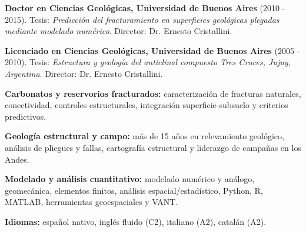 \documentclass[10pt, a4paper]{awesome-cv}
\renewcommand*{\descriptionstyle}[1]{{\fontsize{8.45pt}{10.8pt}\bodyfontlight\upshape\color{text} #1}}
\begin{document}
\vspace{-3mm}
\descriptionstyle{\textbf{Doctor en Ciencias Geológicas, Universidad de Buenos Aires} (2010 - 2015). Tesis: \emph{Predicción del fracturamiento en superficies geológicas plegadas mediante modelado numérico}. Director: Dr. Ernesto Cristallini.}\par
\vspace{0.4mm}
\descriptionstyle{\textbf{Licenciado en Ciencias Geológicas, Universidad de Buenos Aires} (2005 - 2010). Tesis: \emph{Estructura y geología del anticlinal compuesto Tres Cruces, Jujuy, Argentina}. Director: Dr. Ernesto Cristallini.}

\vspace{-3mm}
\descriptionstyle{\textbf{Carbonatos y reservorios fracturados:} caracterización de fracturas naturales, conectividad, controles estructurales, integración superficie-subsuelo y criterios predictivos.}\par
\vspace{0.4mm}
\descriptionstyle{\textbf{Geología estructural y campo:} más de 15 años en relevamiento geológico, análisis de pliegues y fallas, cartografía estructural y liderazgo de campañas en los Andes.}\par
\vspace{0.4mm}
\descriptionstyle{\textbf{Modelado y análisis cuantitativo:} modelado numérico y análogo, geomecánica, elementos finitos, análisis espacial/estadístico, Python, R, MATLAB, herramientas geoespaciales y VANT.}\par
\vspace{0.4mm}
\descriptionstyle{\textbf{Idiomas:} español nativo, inglés fluido (C2), italiano (A2), catalán (A2).}

\newpage
\end{document}
